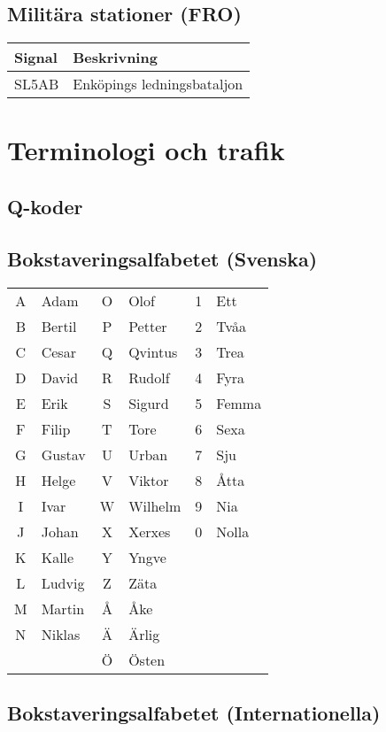 \documentclass[10pt,swedish,a4paper]{article}
\begin{document}
\subsection{Militära stationer (FRO)}

\begin{tabular}{ll}
	Signal & Beskrivning                \\ \hline
	SL5AB  & Enköpings ledningsbataljon
\end{tabular}

\section{Terminologi och trafik}

\subsection{Q-koder}

\subsection{Bokstaveringsalfabetet (Svenska)}

\begin{tabular}{cl|cl|cl }
	A & Adam   & O & Olof    & 1 & Ett \\
	B & Bertil & P & Petter  & 2 & Tvåa \\
	C & Cesar  & Q & Qvintus & 3 & Trea \\
	D & David  & R & Rudolf  & 4 & Fyra \\
	E & Erik   & S & Sigurd  & 5 & Femma \\
	F & Filip  & T & Tore    & 6 & Sexa \\
	G & Gustav & U & Urban   & 7 & Sju \\
	H & Helge  & V & Viktor  & 8 & Åtta \\
	I & Ivar   & W & Wilhelm & 9 & Nia \\
	J & Johan  & X & Xerxes  & 0 & Nolla \\
	K & Kalle  & Y & Yngve   &   &  \\
	L & Ludvig & Z & Zäta    &   &  \\
	M & Martin & Å & Åke     &   &  \\
	N & Niklas & Ä & Ärlig   &   &  \\
	  &        & Ö & Östen   &   &
\end{tabular}

\subsection{Bokstaveringsalfabetet (Internationella)}
\end{document}

